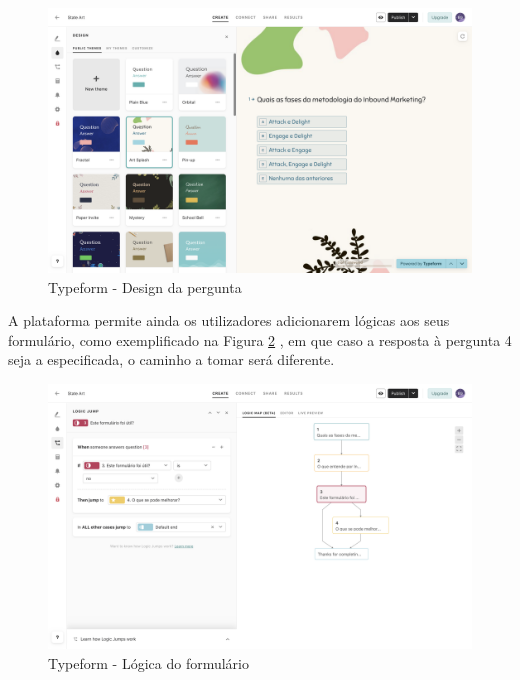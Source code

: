 \begin{figure}[ht!]
	\begin{center}
		\includegraphics[width=1\textwidth]{img/tf/tf-question-custom}
		\caption{Typeform - Design da pergunta}
		\label{fig:tf-question-custom}
	\end{center}
\end{figure}

A plataforma permite ainda os utilizadores adicionarem lógicas aos seus formulário, como exemplificado na Figura \ref{fig:tf-question-logica} , em que caso a resposta à pergunta 4 seja a especificada, o caminho a tomar será diferente. 



\begin{figure}[ht!]
	\begin{center}
		\includegraphics[width=1\textwidth]{img/tf/tf-question-logica}
		\caption{Typeform - Lógica do formulário}
		\label{fig:tf-question-logica}
	\end{center}
\end{figure}

